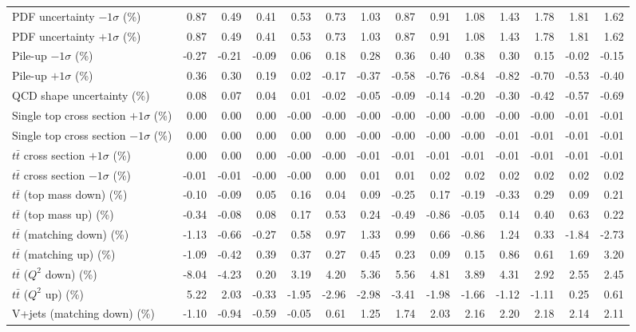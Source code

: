 \begin{table}[htbp]
{\begin{tabular}{lrrrrrrrrrrrrr}
PDF uncertainty $-1\sigma$ (\%) & 0.87 & 0.49 & 0.41 & 0.53 & 0.73 & 1.03 & 0.87 & 0.91 & 1.08 & 1.43 & 1.78 & 1.81 & 1.62 \\ 
PDF uncertainty $+1\sigma$ (\%) & 0.87 & 0.49 & 0.41 & 0.53 & 0.73 & 1.03 & 0.87 & 0.91 & 1.08 & 1.43 & 1.78 & 1.81 & 1.62 \\ 
Pile-up $-1\sigma$ (\%) & -0.27 & -0.21 & -0.09 & 0.06 & 0.18 & 0.28 & 0.36 & 0.40 & 0.38 & 0.30 & 0.15 & -0.02 & -0.15 \\ 
Pile-up $+1\sigma$ (\%) & 0.36 & 0.30 & 0.19 & 0.02 & -0.17 & -0.37 & -0.58 & -0.76 & -0.84 & -0.82 & -0.70 & -0.53 & -0.40 \\ 
QCD shape uncertainty (\%) & 0.08 & 0.07 & 0.04 & 0.01 & -0.02 & -0.05 & -0.09 & -0.14 & -0.20 & -0.30 & -0.42 & -0.57 & -0.69 \\ 
Single top cross section $+1\sigma$ (\%) & 0.00 & 0.00 & 0.00 & -0.00 & -0.00 & -0.00 & -0.00 & -0.00 & -0.00 & -0.00 & -0.00 & -0.01 & -0.01 \\ 
Single top cross section $-1\sigma$ (\%) & 0.00 & 0.00 & 0.00 & 0.00 & 0.00 & -0.00 & -0.00 & -0.00 & -0.00 & -0.01 & -0.01 & -0.01 & -0.01 \\ 
$t\bar{t}$ cross section $+1\sigma$ (\%) & 0.00 & 0.00 & 0.00 & -0.00 & -0.00 & -0.01 & -0.01 & -0.01 & -0.01 & -0.01 & -0.01 & -0.01 & -0.01 \\ 
$t\bar{t}$ cross section $-1\sigma$ (\%) & -0.01 & -0.01 & -0.00 & -0.00 & 0.00 & 0.01 & 0.01 & 0.02 & 0.02 & 0.02 & 0.02 & 0.02 & 0.02 \\ 
$t\bar{t}$ (top mass down) (\%) & -0.10 & -0.09 & 0.05 & 0.16 & 0.04 & 0.09 & -0.25 & 0.17 & -0.19 & -0.33 & 0.29 & 0.09 & 0.21 \\ 
$t\bar{t}$ (top mass up) (\%) & -0.34 & -0.08 & 0.08 & 0.17 & 0.53 & 0.24 & -0.49 & -0.86 & -0.05 & 0.14 & 0.40 & 0.63 & 0.22 \\ 
$t\bar{t}$ (matching down) (\%) & -1.13 & -0.66 & -0.27 & 0.58 & 0.97 & 1.33 & 0.99 & 0.66 & -0.86 & 1.24 & 0.33 & -1.84 & -2.73 \\ 
$t\bar{t}$ (matching up) (\%) & -1.09 & -0.42 & 0.39 & 0.37 & 0.27 & 0.45 & 0.23 & 0.09 & 0.15 & 0.86 & 0.61 & 1.69 & 3.20 \\ 
$t\bar{t}$ ($Q^{2}$ down) (\%) & -8.04 & -4.23 & 0.20 & 3.19 & 4.20 & 5.36 & 5.56 & 4.81 & 3.89 & 4.31 & 2.92 & 2.55 & 2.45 \\ 
$t\bar{t}$ ($Q^{2}$ up) (\%) & 5.22 & 2.03 & -0.33 & -1.95 & -2.96 & -2.98 & -3.41 & -1.98 & -1.66 & -1.12 & -1.11 & 0.25 & 0.61 \\ 
V+jets (matching down) (\%) & -1.10 & -0.94 & -0.59 & -0.05 & 0.61 & 1.25 & 1.74 & 2.03 & 2.16 & 2.20 & 2.18 & 2.14 & 2.11 \\ 

\end{tabular}}
\end{table}
